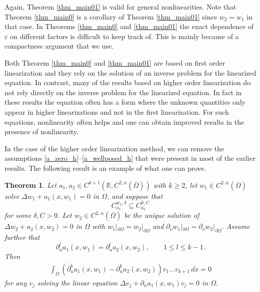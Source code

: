 \documentclass[11pt,a4paper]{amsart}
\newtheorem{Theorem}{Theorem}[section]
\theoremstyle{definition}
\numberwithin{equation}{section}
\newcommand{\mR}{\mathbb{R}}                    %
\newcommand{\ol}[1]{\overline{#1}}
\newcommand{\p}{\partial}
\newcommand{\e}{\varepsilon}
\newcommand{\Om}{\Omega}
\begin{document}
Again, Theorem \ref{thm_main01} is valid for general nonlinearities. Note that Theorem \ref{thm_main0} is a corollary of Theorem \ref{thm_main01} since $w_2=w_1$ in that case. In Theorems \ref{thm_main0} and \ref{thm_main01} the exact dependence of $\e$ on different factors is difficult to keep track of. This is mainly because of a compactness argument that we use.

Both Theorem \ref{thm_main0} and \ref{thm_main01} are based on first order linearization and they rely on the solution of an inverse problem for the linearized equation. In contrast, many of the results based on higher order linearization do not rely directly on the inverse problem for the linearized equation. In fact in these results the equation often has a form where the unknown quantities only appear in higher linearizations and not in the first linearization. For such equations, nonlinearity often helps and one can obtain improved results in the presence of nonlinearity.

In the case of the higher order linearization method, we can remove the assumptions \eqref{a_zero_h}--\eqref{a_wellposed_h} that were present in most of the earlier results. The following result is an example of what one can prove.

\begin{Theorem}\label{thm_main02}
Let $a_1, a_2 \in C^{k+1}(\mR, C^{2,\alpha}(\ol{\Om}))$ with $k \geq 2$, let $w_1 \in C^{2,\alpha}(\ol{\Om})$ solve $\Delta w_1 + a_1(x,w_1) = 0$ in $\Om$, and suppose that 
\[
C_{a_1}^{w_1,\delta} \subseteq C_{a_2}^{0,C}
\]
for some $\delta, C > 0$. Let $w_2 \in C^{2,\alpha}(\ol{\Om})$ be the unique solution of $\Delta w_2 + a_2(x,w_2) = 0$ in $\Om$ with $w_1|_{\p \Om} = w_2|_{\p \Om}$ and $\p_{\nu} w_1|_{\p \Om} = \p_{\nu} w_2|_{\p \Om}$. Assume further that 
\begin{equation} \label{thm02_assumption}
\p_u^l a_1(x,w_1) = \p_u^l a_2(x,w_2), \qquad 1 \leq l \leq k-1.
\end{equation}
Then 
\begin{gather*}
\int_{\Om} (\p_u^k a_1(x,w_1) - \p_u^k a_2(x,w_2)) v_1 \ldots v_{k+1} \,dx = 0
\end{gather*}
for any $v_j$ solving the linear equation $\Delta v_j + \p_u a_1(x,w_1) v_j = 0$ in $\Om$.
\end{Theorem}
\end{document}
